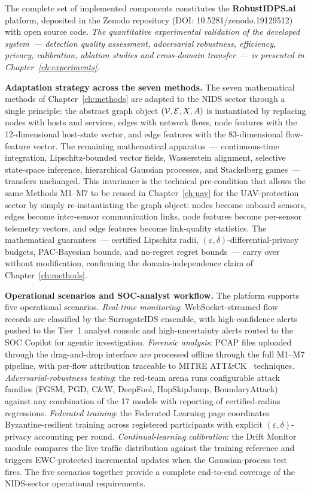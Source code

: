 The complete set of implemented components constitutes the
\textbf{RobustIDPS.ai} platform, deposited in the Zenodo
repository (DOI: 10.5281/zenodo.19129512) with open source code.
\emph{The quantitative experimental validation of the developed
system~--- detection quality assessment, adversarial robustness,
efficiency, privacy, calibration, ablation studies and cross-domain
transfer~--- is presented in Chapter~\ref{ch:experiments}.}

\noindent\textbf{Adaptation strategy across the seven methods.} The seven mathematical methods of Chapter~\ref{ch:methods} are adapted to the NIDS sector through a single principle: the abstract graph object $(\mathcal{V},\mathcal{E},X,A)$ is instantiated by replacing nodes with hosts and services, edges with network flows, node features with the 12-dimensional host-state vector, and edge features with the 83-dimensional flow-feature vector. The remaining mathematical apparatus~--- continuous-time integration, Lipschitz-bounded vector fields, Wasserstein alignment, selective state-space inference, hierarchical Gaussian processes, and Stackelberg games~--- transfers unchanged. This invariance is the technical pre-condition that allows the same Methods M1--M7 to be reused in Chapter~\ref{ch:uav} for the UAV-protection sector by simply re-instantiating the graph object: nodes become onboard sensors, edges become inter-sensor communication links, node features become per-sensor telemetry vectors, and edge features become link-quality statistics. The mathematical guarantees~--- certified Lipschitz radii, $(\varepsilon,\delta)$-differential-privacy budgets, PAC-Bayesian bounds, and no-regret regret bounds~--- carry over without modification, confirming the domain-independence claim of Chapter~\ref{ch:methods}.

\noindent\textbf{Operational scenarios and SOC-analyst workflow.} The platform supports five operational scenarios. \emph{Real-time monitoring}: WebSocket-streamed flow records are classified by the SurrogateIDS ensemble, with high-confidence alerts pushed to the Tier~1 analyst console and high-uncertainty alerts routed to the SOC Copilot for agentic investigation. \emph{Forensic analysis}: PCAP files uploaded through the drag-and-drop interface are processed offline through the full M1--M7 pipeline, with per-flow attribution traceable to MITRE ATT\&CK~\cite{Hernandez2015} techniques. \emph{Adversarial-robustness testing}: the red-team arena runs configurable attack families (FGSM, PGD, C\&W, DeepFool, HopSkipJump, BoundaryAttack) against any combination of the 17 models with reporting of certified-radius regressions. \emph{Federated training}: the Federated Learning page coordinates Byzantine-resilient training across registered participants with explicit $(\varepsilon,\delta)$-privacy accounting per round. \emph{Continual-learning calibration}: the Drift Monitor module compares the live traffic distribution against the training reference and triggers EWC-protected incremental updates when the Gaussian-process test fires. The five scenarios together provide a complete end-to-end coverage of the NIDS-sector operational requirements.
